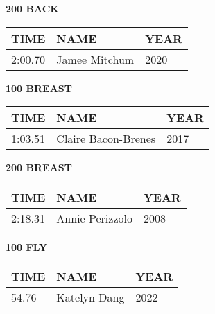 \begin{minipage}[t]{0.48\textwidth}
\centering
\textbf{200 BACK}\\[0.05cm]
\begin{tabular}{@{}p{1.8cm}p{2.8cm}p{1.2cm}@{}}
\hline
\textbf{TIME} & \textbf{NAME} & \textbf{YEAR} \\
\hline
2:00.70 & Jamee Mitchum & 2020 \\
\hline
\end{tabular}
\end{minipage}\hfill
\begin{minipage}[t]{0.48\textwidth}
\centering
\textbf{100 BREAST}\\[0.05cm]
\begin{tabular}{@{}p{1.8cm}p{2.8cm}p{1.2cm}@{}}
\hline
\textbf{TIME} & \textbf{NAME} & \textbf{YEAR} \\
\hline
1:03.51 & Claire Bacon-Brenes & 2017 \\
\hline
\end{tabular}
\end{minipage}

\vspace{0.4cm}

\begin{minipage}[t]{0.48\textwidth}
\centering
\textbf{200 BREAST}\\[0.05cm]
\begin{tabular}{@{}p{1.8cm}p{2.8cm}p{1.2cm}@{}}
\hline
\textbf{TIME} & \textbf{NAME} & \textbf{YEAR} \\
\hline
2:18.31 & Annie Perizzolo & 2008 \\
\hline
\end{tabular}
\end{minipage}\hfill
\begin{minipage}[t]{0.48\textwidth}
\centering
\textbf{100 FLY}\\[0.05cm]
\begin{tabular}{@{}p{1.8cm}p{2.8cm}p{1.2cm}@{}}
\hline
\textbf{TIME} & \textbf{NAME} & \textbf{YEAR} \\
\hline
54.76 & Katelyn Dang & 2022 \\
\hline
\end{tabular}
\end{minipage}

\vspace{0.4cm}

